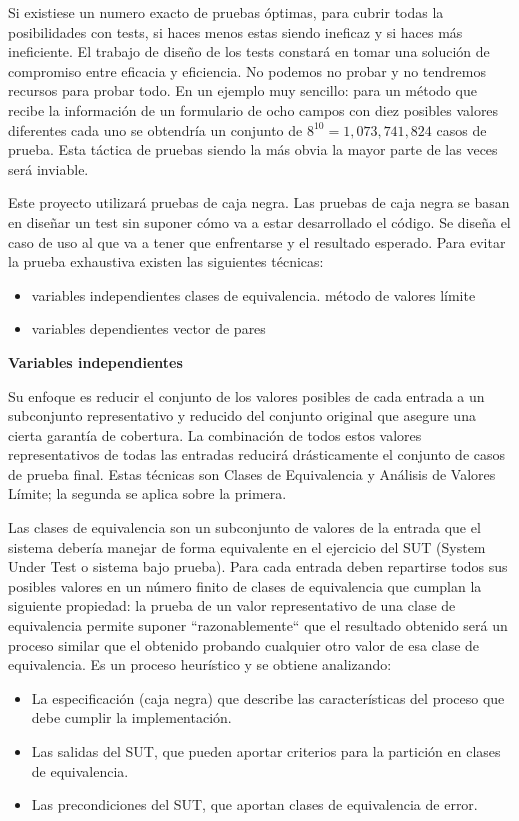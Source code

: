 Si existiese un numero exacto de pruebas óptimas, para cubrir todas la posibilidades con tests, si haces menos estas siendo ineficaz y si haces más ineficiente.
El trabajo de diseño de los tests constará en tomar una solución de compromiso entre eficacia y eficiencia.
No podemos no probar y no tendremos recursos para probar todo.
En un ejemplo muy sencillo: para un método que recibe la información de un formulario de ocho campos con diez posibles valores diferentes cada uno se obtendría un conjunto de $8^{10} = 1,073,741,824$ casos de prueba.
Esta táctica de pruebas siendo la más obvia la mayor parte de las veces será inviable.

Este proyecto utilizará pruebas de caja negra.
Las pruebas de caja negra se basan en diseñar un test sin suponer cómo va a estar desarrollado el código.
Se diseña el caso de uso al que va a tener que enfrentarse y el resultado esperado.
Para evitar la prueba exhaustiva existen las siguientes técnicas:

\begin{itemize}
    \item variables independientes
    \subitem clases de equivalencia.
    \subitem método de valores límite
    \item variables dependientes
    \subitem vector de pares
\end{itemize}

\textbf{Variables independientes}

Su enfoque es reducir el conjunto de los valores posibles de cada entrada a un subconjunto representativo y reducido del conjunto original que asegure una cierta garantía de cobertura.
La combinación de todos estos valores representativos de todas las entradas reducirá drásticamente el conjunto de casos de prueba final.
Estas técnicas son Clases de Equivalencia y Análisis de Valores Límite;
la segunda se aplica sobre la primera.

Las clases de equivalencia son un subconjunto de valores de la entrada que el sistema debería manejar de forma equivalente en el ejercicio del \gls{SUT} (System Under Test o sistema bajo prueba).
Para cada entrada deben repartirse todos sus posibles valores en un número finito de clases de equivalencia que cumplan la siguiente propiedad: la prueba de un valor representativo de una clase de equivalencia permite suponer “razonablemente“ que el resultado obtenido será un proceso similar que el obtenido probando cualquier otro valor de esa clase de equivalencia.
Es un proceso heurístico y se obtiene analizando:
\begin{itemize}
    \item La especificación (caja negra) que describe las características del proceso que debe cumplir la implementación.
    \item Las salidas del SUT, que pueden aportar criterios para la partición en clases de equivalencia.
    \item Las precondiciones del SUT, que aportan clases de equivalencia de error.
\end{itemize}

